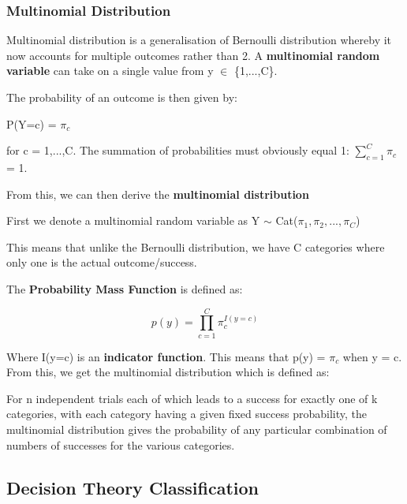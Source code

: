 \documentclass[11pt, oneside]{article}
\theoremstyle{definition}
\begin{document}
\subsubsection{Multinomial Distribution}
Multinomial distribution is a generalisation of Bernoulli distribution whereby it now accounts for multiple outcomes rather than 2. A \textbf{multinomial random variable} can take on a single value from y $\in$ \{1,...,C\}.

The probability of an outcome is then given by:
\begin{center}
P(Y=c) = $\pi_{c}$
\end{center}
for c = 1,...,C. The summation of probabilities must obviously equal 1:  $\sum\limits_{c=1}^{C}\pi_{c}$ = 1.

From this, we can then derive the \textbf{multinomial distribution}
\begin{center}
First we denote a multinomial random variable as Y $\sim$ Cat($\pi_1, \pi_2, ... , \pi_C$)

This means that unlike the Bernoulli distribution, we have C categories where only one is the actual outcome/success.

The \textbf{Probability Mass Function} is defined as:
\end{center}
$$
p(y) =   \prod\limits_{c=1}^{C} \pi_{c}^{I(y=c)}
$$

Where I(y=c) is an \textbf{indicator function}. This means that p(y) = $\pi_c$ when y = c.\\
From this, we get the multinomial distribution which is defined as:
\begin{center}
For n independent trials each of which leads to a success for exactly one of k categories, with each category having a given fixed success probability, the multinomial distribution gives the probability of any particular combination of numbers of successes for the various categories.
\end{center}

\subsection{Decision Theory Classification}
\end{document}

